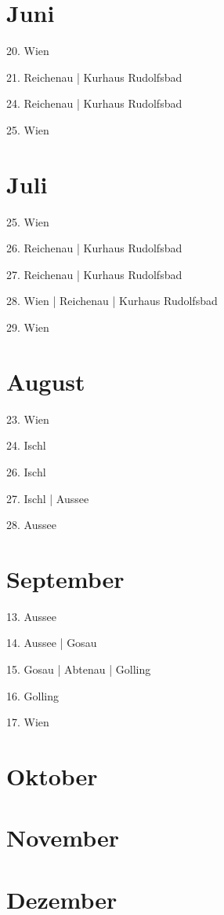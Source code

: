 \documentclass[twoside=false,titlepage=false,open=any, parskip=never, fontsize=10pt, headings=small, chapterprefix=false, appendixprefix=false, DIV=15]{scrbook}
\begin{document}
\begin{multicols}{3}
            \section*{Juni}
            20. Wien\par
            21. Reichenau | Kurhaus Rudolfsbad\par
            24. Reichenau | Kurhaus Rudolfsbad\par
            25. Wien\par
            \section*{Juli}
            25. Wien\par
            26. Reichenau | Kurhaus Rudolfsbad\par
            27. Reichenau | Kurhaus Rudolfsbad\par
            28. Wien | Reichenau | Kurhaus Rudolfsbad\par
            29. Wien\par
            \section*{August}
            23. Wien\par
            24. Ischl\par
            26. Ischl\par
            27. Ischl | Aussee\par
            28. Aussee\par
            \section*{September}
            13. Aussee\par
            14. Aussee | Gosau\par
            15. Gosau | Abtenau | Golling\par
            16. Golling\par
            17. Wien\par
            \section*{Oktober}
            \section*{November}
            \section*{Dezember}

\end{multicols}
\end{document}
